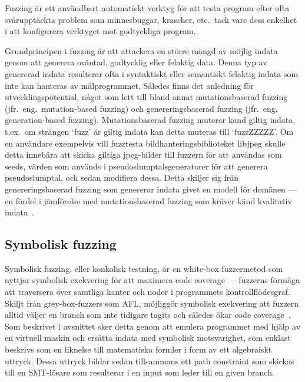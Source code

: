 Fuzzing är ett användbart automatiskt verktyg för att testa program efter ofta
svårupptäckta problem som minnesbuggar, krascher, etc.\ tack vare dess enkelhet i
att konfigurera verktyget mot godtyckliga program.

Grundprincipen i fuzzing är att attackera en större mängd av möjlig indata genom
att generera oväntad, godtycklig eller felaktig data. Denna typ av genererad
indata resulterar ofta i syntaktiskt eller semantiskt felaktig indata som inte
kan hanteras av målprogrammet. Således finns det anledning för
utvecklingspotential, något som lett till bland annat mutationsbaserad fuzzing
(jfr.\ eng.\ mutation-based fuzzing) och genereringsbaserad fuzzing (jfr.\ eng.
generation-based fuzzing). Mutationsbaserad fuzzing muterar känd giltig indata,
t.ex.\ om strängen `fuzz' är giltig indata kan detta muteras till `fuzzZZZZZ'. Om
en användare exempelvis vill fuzztesta bildhanteringsbiblioteket libjpeg skulle
detta innebära att skicka giltiga jpeg-bilder till fuzzern för att användas som
seeds, värden som används i pseudoslumptalsgeneratorer för att generera
pseudoslumptal, och sedan modifiera dessa. Detta skiljer sig från
genereringsbaserad fuzzing som genererar indata givet en modell för domänen ---
en fördel i jämförelse med mutationsbaserad fuzzing som kräver känd kvalitativ
indata~\cite{fuzzing}.

\subsection{Symbolisk fuzzing} Symbolisk fuzzing, eller konkolisk testning, är en
white-box fuzzermetod som nyttjar symbolisk exekvering för att maximera code
coverage --- fuzzerns förmåga att traversera över samtliga kanter och noder i
programmets kontrollflödesgraf. Skiljt från grey-box-fuzzers som AFL, möjliggör
symbolisk exekvering att fuzzern alltid väljer en branch som inte tidigare
tagits och således ökar code coverage~\cite{challenges_fuzzing}. Som beskrivet i
avsnittet  sker detta genom att emulera programmet
med hjälp av en virtuell maskin och ersätta indata med symbolisk motsvarighet,
som enklast beskrivs som en liknelse till matematiska formler i form av ett
algebraiskt uttryck. Dessa uttryck bildar sedan tillsammans ett path constraint
som skickas till en SMT-lösare som resulterar i en input som leder till en given
branch.


